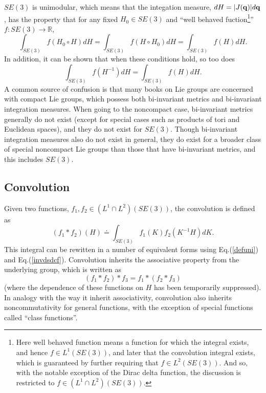 \documentclass[twocolumn,10pt]{asme2ej}
\begin{document}
$SE(3)$ is unimodular, which means that the integation measure, $dH = |J({\bf q})| d{\bf q}$, has the property that for any
fixed $H_0 \in SE(3)$ and ``well behaved fuction\footnote{Here well behaved function means a function for which the integral exists, and hence
$f \in L^1(SE(3))$, and later that the convolution integral exists, which is guaranteed by further requiring that
$f \in L^2(SE(3))$. And so, with the notable exception of the Dirac delta function, the discussion is restricted to
$f \in (L^1 \cap L^2)(SE(3))$.}'' $f:SE(3) \rightarrow \mathbb{R}$, \cite{myoldbook}
\begin{equation}
\int_{SE(3)} f(H_0 \circ H) dH = \int_{SE(3)} f(H \circ H_0) dH = \int_{SE(3)} f(H) dH.
\label{defuni}
\end{equation}
In addition, it can be shown that when these conditions hold, so too does
\begin{equation}
\int_{SE(3)} f(H^{-1}) dH = \int_{SE(3)} f(H) dH.
\label{invdsdcf}
\end{equation}
A common source of confusion is that many books on Lie groups are concerned with compact Lie groups, which possess both bi-invariant metrics
and bi-invariant integration measures. When going to the noncompact case, bi-invariant metrics generally do not exist (except for special cases
such as products of tori and Euclidean spaces), and they do not exist for $SE(3)$. Though bi-invariant integration measures also do not exist in general,
they do exist for a broader class of special noncompact Lie groups than those that have bi-invariant metrics, and this includes $SE(3)$. 

\subsection*{Convolution} \label{convsec}

Given two functions, $f_1, f_2 \in (L^1 \cap L^2)(SE(3))$, the convolution is defined as
\begin{equation}
(f_1 * f_2)(H) \doteq \int_{SE(3)} f_1(K) f_2(K^{-1} H) dK. 
\label{convdef}
\end{equation}
This integral can be rewitten in a number of equivalent forms using Eq.(\ref{defuni}) and Eq.(\ref{invdsdcf}).
Convolution inherits the associative property from the underlying group, which is written as 
$$ (f_1 * f_2) * f_3 = f_1 * (f_2 * f_3) $$
(where the dependence of these functions on $H$ has been temporarily suppressed). In analogy with the way it inherit associativity, convolution 
also inherits noncommutativity for general functions, with the exception of special functions called ``class functions''.
\end{document}
